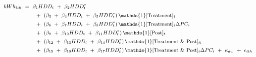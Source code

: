 \begin{align}
\small
\begin{split}
    kWh_{ith} \ 
    & = \ \beta_{1} HDD_{t} \ + \ \beta_{2} HDD_{t}^{*} \\
    & \hspace{0.7cm} + \ \left( \beta_{3} \ + \ \beta_{4} HDD_{t} \ + \ \beta_{5} HDD_{t}^{*} \right) \mathds{1}[\text{Treatment}]_{i} \\
    & \hspace{0.7cm} + \ \left( \beta_{6} \ + \ \beta_{7} HDD_{t} \ + \ \beta_{8} HDD_{t}^{*} \right) \mathds{1}[\text{Treatment}]_{i} \Delta PC_{i} \\
    & \hspace{0.7cm} + \ \left( \beta_{9} \ + \ \beta_{10} HDD_{t} \ + \ \beta_{11} HDD_{t}^{*} \right) \mathds{1}[\text{Post}]_{t} \\
    & \hspace{0.7cm} + \ \left( \beta_{12} \ + \ \beta_{13} HDD_{t} \ + \ \beta_{14} HDD_{t}^{*} \right) \mathds{1}[\text{Treatment \& Post}]_{it} \\
    & \hspace{0.7cm} + \ \left( \beta_{15} \ + \ \beta_{16} HDD_{t} \ + \ \beta_{17} HDD_{t}^{*} \right) \mathds{1}[\text{Treatment \& Post}]_{i} \Delta PC_{i} \ + \ \kappa_{dw} \ + \ \epsilon_{ith}
\end{split}
\label{Eq:Model-Specification_Breakdown-of-Hourly-Average-Treatment-Effect-as-a-Linear-Function-of-Price-Changes}
\end{align}
